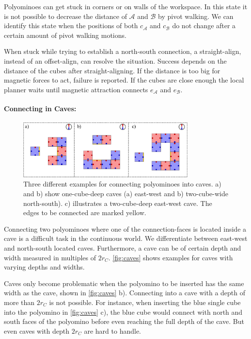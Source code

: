 Polyominoes can get stuck in corners or on walls of the workspace.
In this state it is not possible to decrease the distance of $\mathcal{A}$ and $\mathcal{B}$ by pivot walking.
We can identify this state when the positions  of both $c_\mathcal{A}$ and $c_\mathcal{B}$ do not change after a certain amount of pivot walking motions.

When stuck while trying to establish a north-south connection, a straight-align, instead of an offset-align, can resolve the situation.
Success depends on the distance of the cubes after straight-aligning.
If the distance is too big for magnetic forces to act, failure is reported.
If the cubes are close enough the local planner waits until magnetic attraction connects $e_\mathcal{A}$ and $e_\mathcal{B}$.


\paragraph{Connecting in Caves:}

\begin{figure}
	\centering
	\includegraphics[width=0.80\textwidth]{figures/caves.pdf}
	\caption[Examples for connecting polyominoes into caves]{Three different examples for connecting polyominoes into caves. a) and b) show one-cube-deep caves (a) east-west and b) two-cube-wide north-south). c) illustrates a two-cube-deep east-west cave. The edges to be connected are marked yellow.}
	\label{fig:caves}
\end{figure}

Connecting two polyominoes where one of the connection-faces is located inside a cave is a difficult task in the continuous world.
We differentiate between east-west and north-south located caves.
Furthermore, a cave can be of certain depth and width measured in multiples of $2 r_C$.
\autoref{fig:caves} shows examples for caves with varying depths and widths.

Caves only become problematic when the polyomino to be inserted has the same width as the cave, shown in \autoref{fig:caves} b).
Connecting into a cave with a depth of more than $2 r_C$ is not possible.
For instance, when inserting the blue single cube into the polyomino in \autoref{fig:caves} c), the blue cube would connect with north and south faces of the polyomino before even reaching the full depth of the cave.
But even caves with depth $2 r_C$ are hard to handle.

